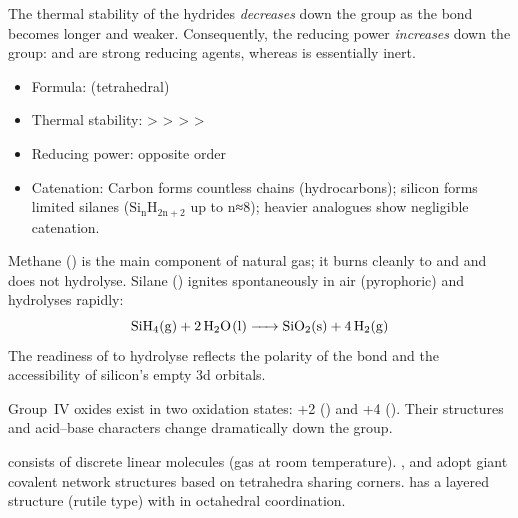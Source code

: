 \documentclass[11pt]{article}
\newcounter{popsec}
\newcounter{popsub}
\newcommand{\courssub}[1]{%
  \stepcounter{popsub}%
  \par\vspace{9pt}\noindent{\popxbold\fontsize{11.5}{13}\selectfont\color{popink}{\color{poporange}\thepopsec.\thepopsub}\hspace{6pt}#1}\par\nopagebreak\vspace{4pt}
}
\begin{document}
\begin{propriete}
The thermal stability of the hydrides \emph{decreases} down the group as the  bond becomes longer and weaker. Consequently, the reducing power \emph{increases} down the group:  and  are strong reducing agents, whereas  is essentially inert.
\end{propriete}

\begin{aretenir}
\begin{itemize}
\item Formula:  (tetrahedral)
\item Thermal stability:  >  >  >  > 
\item Reducing power: opposite order
\item Catenation: Carbon forms countless  chains (hydrocarbons); silicon forms limited silanes (\ensuremath{\mathrm{Si_nH_{2n+2}}} up to n≈8); heavier analogues show negligible catenation.
\end{itemize}
\end{aretenir}

\begin{exemplebox}
Methane () is the main component of natural gas; it burns cleanly to  and  and does not hydrolyse. Silane () ignites spontaneously in air (pyrophoric) and hydrolyses rapidly:
\[
\ce{SiH4(g) + 2H2O(l) -> SiO2(s) + 4H2(g)}
\]
The readiness of  to hydrolyse reflects the polarity of the  bond and the accessibility of silicon's empty 3d orbitals.
\end{exemplebox}

\courssub{Oxides of Group IV}

Group~IV oxides exist in two oxidation states: +2 () and +4 (). Their structures and acid–base characters change dramatically down the group.

\begin{propriete}
 consists of discrete linear  molecules (gas at room temperature). ,  and  adopt giant covalent network structures based on \ce{[XO4]} tetrahedra sharing corners.  has a layered structure (rutile type) with  in octahedral coordination.
\end{propriete}
\end{document}
